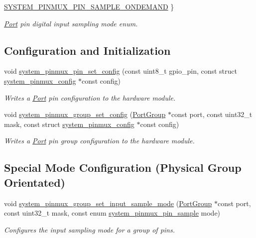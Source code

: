 \begin{DoxyCompactItemize}
\hyperlink{group__asfdoc__sam0__system__pinmux__group_ggac0c5f124b2d0deed3751156f20135994ad695b5c51ca3cb2a7c35bb32209325a2}{S\+Y\+S\+T\+E\+M\+\_\+\+P\+I\+N\+M\+U\+X\+\_\+\+P\+I\+N\+\_\+\+S\+A\+M\+P\+L\+E\+\_\+\+O\+N\+D\+E\+M\+A\+N\+D}
 \}
\begin{DoxyCompactList}\small\item\em \hyperlink{struct_port}{Port} pin digital input sampling mode enum. \end{DoxyCompactList}\end{DoxyCompactItemize}
\subsection*{Configuration and Initialization}
\begin{DoxyCompactItemize}
\item 
void \hyperlink{group__asfdoc__sam0__system__pinmux__group_ga4aff9a23bc1233d74847bcdee4494439}{system\+\_\+pinmux\+\_\+pin\+\_\+set\+\_\+config} (const uint8\+\_\+t gpio\+\_\+pin, const struct \hyperlink{structsystem__pinmux__config}{system\+\_\+pinmux\+\_\+config} $\ast$const config)
\begin{DoxyCompactList}\small\item\em Writes a \hyperlink{struct_port}{Port} pin configuration to the hardware module. \end{DoxyCompactList}\item 
void \hyperlink{group__asfdoc__sam0__system__pinmux__group_ga7f19e634e8c05c0a84cebaf36054d78e}{system\+\_\+pinmux\+\_\+group\+\_\+set\+\_\+config} (\hyperlink{struct_port_group}{Port\+Group} $\ast$const port, const uint32\+\_\+t mask, const struct \hyperlink{structsystem__pinmux__config}{system\+\_\+pinmux\+\_\+config} $\ast$const config)
\begin{DoxyCompactList}\small\item\em Writes a \hyperlink{struct_port}{Port} pin group configuration to the hardware module. \end{DoxyCompactList}\end{DoxyCompactItemize}
\subsection*{Special Mode Configuration (Physical Group Orientated)}
\begin{DoxyCompactItemize}
\item 
void \hyperlink{group__asfdoc__sam0__system__pinmux__group_gaf01f6297e4699bf54b3df70d29f72593}{system\+\_\+pinmux\+\_\+group\+\_\+set\+\_\+input\+\_\+sample\+\_\+mode} (\hyperlink{struct_port_group}{Port\+Group} $\ast$const port, const uint32\+\_\+t mask, const enum \hyperlink{group__asfdoc__sam0__system__pinmux__group_gac0c5f124b2d0deed3751156f20135994}{system\+\_\+pinmux\+\_\+pin\+\_\+sample} mode)
\begin{DoxyCompactList}\small\item\em Configures the input sampling mode for a group of pins. \end{DoxyCompactList}\end{DoxyCompactItemize}


